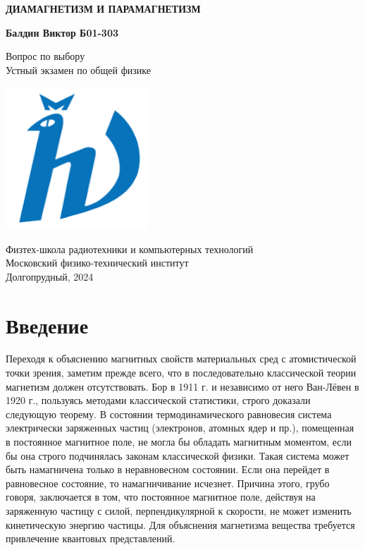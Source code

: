 \documentclass[12pt]{article}
\begin{document}
  \begin{titlepage}
      \begin{center}
          \vspace*{1cm}

          \Huge
          \textbf{ДИАМАГНЕТИЗМ И ПАРАМАГНЕТИЗМ}

          \vspace{1.5cm}

          \Large
          \textbf{Балдин Виктор Б01-303}

          \vfill

          Вопрос по выбору \\
          Устный экзамен по общей физике

          \vspace{0.8cm}

          \includegraphics[width=0.4\textwidth]{university_logo.png}

          Физтех-школа радиотехники и компьютерных технологий\\
          Московский физико-технический институт\\
          Долгопрудный, 2024
      \end{center}
  \end{titlepage}

  \tableofcontents

  \section{Введение}
  Переходя к объяснению магнитных свойств материальных сред с атомистической точки зрения, заметим прежде всего, что в последовательно классической теории магнетизм должен отсутствовать. Бор в 1911 г. и независимо от него Ван-Лёвен в 1920 г., пользуясь методами классической статистики, строго доказали следующую теорему. В состоянии термодинамического равновесия система электрически заряженных частиц (электронов, атомных ядер и пр.), помещенная в постоянное магнитное поле, не могла бы обладать магнитным моментом, если бы она строго подчинялась законам классической физики. Такая система может быть намагничена только в неравновесном состоянии. Если она перейдет в равновесное состояние, то намагничивание исчезнет. Причина этого, грубо говоря, заключается в том, что постоянное магнитное поле, действуя на заряженную частицу с силой, перпендикулярной к скорости, не может изменить кинетическую энергию частицы. Для объяснения магнетизма вещества требуется привлечение квантовых представлений.
\end{document}
